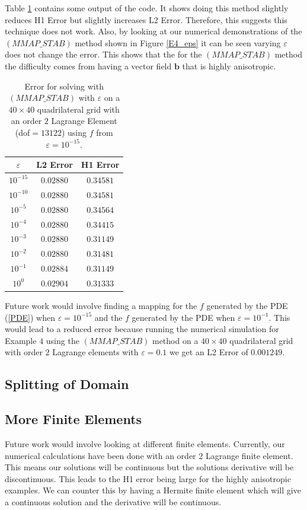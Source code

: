 \documentclass[12pt]{ociamthesis}
\begin{document}
Table \ref{Tbl_Map_f} contains some output of the code. It shows doing this method slightly reduces H1 Error but slightly increases L2 Error. Therefore, this suggests this technique does not work. Also, by looking at our numerical demonstrations of the $(MMAP\_STAB)$ method shown in Figure \ref{E4_eps} it can be seen varying $\varepsilon$ does not change the error. This shows that the for the $(MMAP\_STAB)$ method the difficulty comes from having a vector field $\mathbf{b}$ that is highly anisotropic. 
\begin{table}[H]
\begin{center}
\begin{tabular}{||ccc||}
\cline{2-3}
\multicolumn{1}{c|}{$\varepsilon$} & \multicolumn{1}{c|}{L2 Error} & \multicolumn{1}{c|}{H1 Error} \\
\hline 
\hline
$10^{-15}$  &  $0.02880$   &  $0.34581$\\
$10^{-10}$  &  $0.02880$   &  $0.34581$\\
$10^{-5}$  &  $0.02880$   &  $0.34564$\\
$10^{-4}$  &  $0.02880$   &  $0.34415$\\
$10^{-3}$  &  $0.02880$   &  $0.31149$\\
$10^{-2}$  &  $0.02880$   &  $0.31481$\\
$10^{-1}$  &  $0.02884$   &  $0.31149$\\
$10^{0}$  &  $0.02904$   &  $0.31333$\\
\hline
\end{tabular}
\end{center}
\caption{Error for solving with $(MMAP\_STAB)$ with $\varepsilon$ on a $40 \times 40$ quadrilateral grid with an order $2$ Lagrange Element (dof$=13122$) using $f$ from $\varepsilon=10^{-15}$.}
\label{Tbl_Map_f}
\end{table}
Future work would involve finding a mapping for the $f$ generated by the PDE (\ref{PDE}) when $\varepsilon=10^{-15}$ and the $f$ generated by the PDE when $\varepsilon=10^{-1}$. This would lead to a reduced error because running the numerical simulation for Example $4$ using the $(MMAP\_STAB)$ method on a $40 \times 40$ quadrilateral grid with order $2$ Lagrange elements with $\varepsilon = 0.1$ we get an L2 Error of $0.001249$.

\subsection{Splitting of Domain}


\subsection{More Finite Elements} \label{FE_HER}
Future work would involve looking at different finite elements. Currently, our numerical calculations have been done with an order $2$ Lagrange finite element. This means our solutions will be continuous but the solutions derivative will be discontinuous. This leads to the H1 error being large for the highly anisotropic examples. We can counter this by having a Hermite finite element which will give a continuous solution and the derivative will be continuous.
\end{document}
